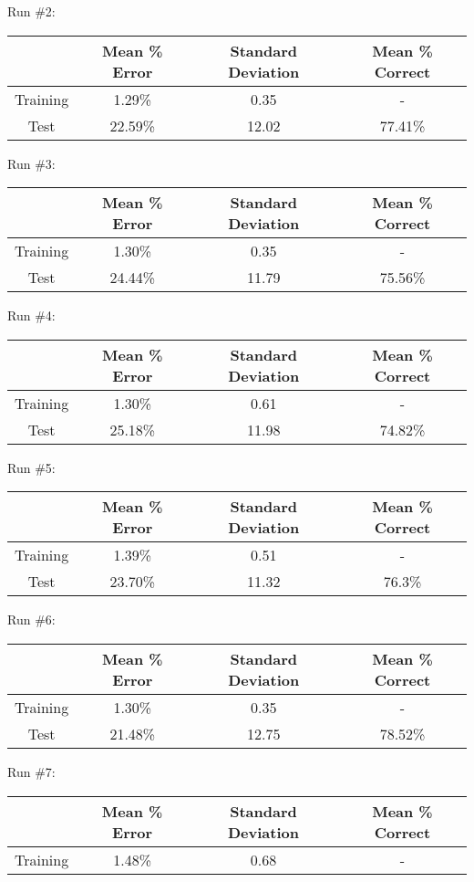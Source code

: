 \documentclass[11pt]{article}  %
\begin{document}
{{Run \#2: 
\begin{center}
\begin{tabular}{c|c|c|c}
& \textbf{Mean \% Error} & Standard Deviation & Mean \% Correct\\
\hline
Training & 1.29\% & 0.35 & -\\
\hline
Test & 22.59\% & 12.02 & 77.41\%
\end{tabular}
\end{center}
Run \#3: 
\begin{center}
\begin{tabular}{c|c|c|c}
& \textbf{Mean \% Error} & Standard Deviation & Mean \% Correct\\
\hline
Training & 1.30\% & 0.35 & - \\
\hline
Test & 24.44\% & 11.79 & 75.56\%
\end{tabular}
\end{center}
Run \#4: 
\begin{center}
\begin{tabular}{c|c|c|c}
& \textbf{Mean \% Error} & Standard Deviation & Mean \% Correct\\
\hline
Training & 1.30\% & 0.61  & - \\
\hline
Test & 25.18\% & 11.98 & 74.82\%
\end{tabular}
\end{center}
Run \#5: 
\begin{center}
\begin{tabular}{c|c|c|c}
& \textbf{Mean \% Error} & Standard Deviation & Mean \% Correct\\
\hline
Training & 1.39\% & 0.51 & - \\
\hline
Test & 23.70\% & 11.32 & 76.3\%
\end{tabular}
\end{center}
Run \#6: 
\begin{center}
\begin{tabular}{c|c|c|c}
& \textbf{Mean \% Error} & Standard Deviation & Mean \% Correct\\
\hline
Training & 1.30\% & 0.35 & - \\
\hline
Test & 21.48\% & 12.75 & 78.52\%
\end{tabular}
\end{center}
Run \#7: 
\begin{center}
\begin{tabular}{c|c|c|c}
& \textbf{Mean \% Error} & Standard Deviation & Mean \% Correct\\
\hline
Training & 1.48\% & 0.68 & - \\

\end{tabular}
\end{center}}}
\end{document}
